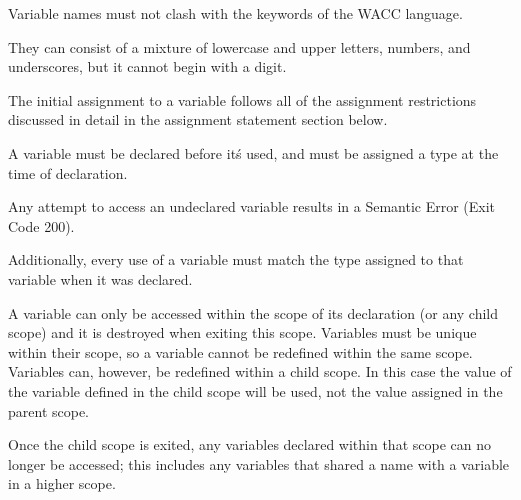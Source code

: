 \documentclass[a4paper]{article}
\theoremstyle{definition}
\begin{document}
Variable names must not clash with the keywords of the WACC language.

They can consist of a mixture of lowercase and upper letters, numbers, and underscores, but it cannot begin with a digit.

The initial assignment to a variable follows all of the assignment restrictions discussed in detail in the assignment statement section below.

A variable must be declared before it\'s used, and must be assigned a type at the time of declaration.

Any attempt to access an undeclared variable results in a Semantic Error (Exit Code 200).

Additionally, every use of a variable must match the type assigned to that variable when it was declared.

A variable can only be accessed within the scope of its declaration (or any child scope) and it is destroyed when exiting this scope.
Variables must be unique within their scope, so a variable cannot be redefined within the same scope.
Variables can, however, be redefined within a child scope.
In this case the value of the variable defined in the child scope will be used, not the value assigned in the parent scope.

Once the child scope is exited, any variables declared within that scope can no longer be accessed; this includes any variables that shared a name with a variable in a higher scope.
\end{document}
